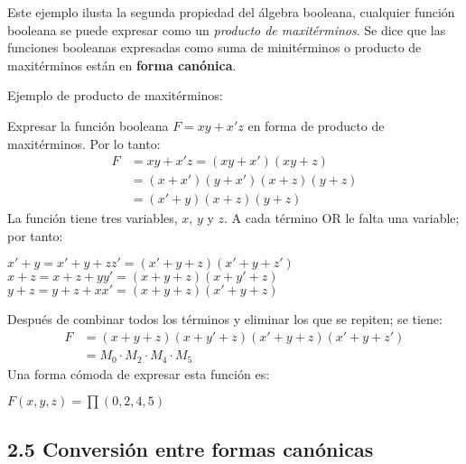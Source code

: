 \documentclass{article}
\begin{document}
Este ejemplo ilusta la segunda propiedad del \'{a}lgebra booleana, cualquier funci\'{o}n booleana se puede
expresar como un \textit{producto de maxit\'{e}rminos}. Se dice que las funciones booleanas 
expresadas como suma de minit\'{e}rminos o producto de maxit\'{e}rminos est\'{a}n en \textbf{forma can\'{o}nica}.
\medbreak

Ejemplo de producto de maxit\'{e}rminos:
\begin{flushleft}
    Expresar la funci\'{o}n booleana $F = xy + x'z$ en forma de producto de maxit\'{e}rminos. Por lo tanto:
    \begin{align*}
        F &= xy + x'z = (xy + x')(xy + z) \\
        &= (x + x')(y + x')(x + z)(y + z) \\
        &= (x' + y)(x + z)(y + z)
    \end{align*}
    La funci\'{o}n tiene tres variables, $x$, $y$ y $z$. A cada t\'{e}rmino OR le falta una variable; por tanto:
    \begin{center}
        $x' + y = x' + y + zz' = (x' + y + z)(x' + y + z')$ \\
        $x + z = x + z + yy' = (x + y + z)(x + y' + z)$ \\
        $y + z = y + z + xx' = (x + y + z)(x' + y + z)$
    \end{center}
    Despu\'{e}s de combinar todos los t\'{e}rminos y eliminar los que se repiten; se tiene:
    \begin{align*}
        F &= (x + y + z)(x + y' + z)(x' + y + z)(x' + y + z') \\
        &= M_0 \cdot M_2 \cdot M_4 \cdot M_5
    \end{align*}
    Una forma c\'{o}moda de expresar esta funci\'{o}n es:
    \begin{center}
        $F(x, y, z) = \prod(0, 2, 4, 5)$
    \end{center}
\end{flushleft}

\subsection*{2.5 Conversi\'{o}n entre formas can\'{o}nicas}
\end{document}
